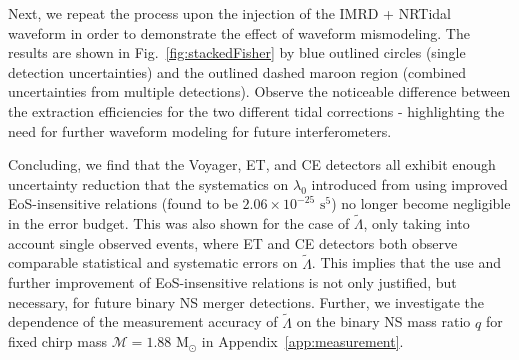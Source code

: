 \documentclass[prd,twocolumn,nofootinbib,superscriptaddress,amsmath,amssymb]{revtex4-1}
\begin{document}
Next, we repeat the process upon the injection of the IMRD + NRTidal waveform in order to demonstrate the effect of waveform mismodeling.
The results are shown in Fig.~\ref{fig:stackedFisher} by blue outlined circles (single detection uncertainties) and the outlined dashed maroon region (combined uncertainties from multiple detections).
Observe the noticeable difference between the extraction efficiencies for the two different tidal corrections - highlighting the need for further waveform modeling for future interferometers.

Concluding, we find that the Voyager, ET, and CE detectors all exhibit enough uncertainty reduction that the systematics on $\lambda_0$ introduced from using improved EoS-insensitive relations (found to be $2.06 \times 10^{-25}\text{ s}^5$) no longer become negligible in the error budget.
This was also shown for the case of $\tilde\Lambda$, only taking into account single observed events, where ET and CE detectors both observe comparable statistical and systematic errors on $\tilde\Lambda$.
This implies that the use and further improvement of EoS-insensitive relations is not only justified, but necessary, for future binary NS merger detections.
Further, we investigate the dependence of the measurement accuracy of $\tilde\Lambda$ on the binary NS mass ratio $q$ for fixed chirp mass $\mathcal{M}=1.88\text{ M}_{\odot}$ in Appendix~\ref{app:measurement}.

\end{document}
